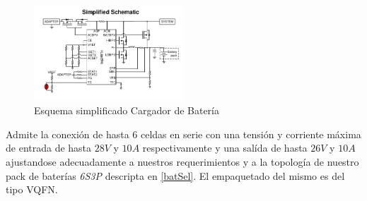 \documentclass[10pt,a4paper]{article}
\begin{document}
\begin{figure}[h!]
    \centering
    \includegraphics[width=0.5\textwidth]{bat_char/simp_sch_char.png}
    \caption{Esquema simplificado Cargador de Batería}
    \label{fig:simp_sch_char}
\end{figure}
\FloatBarrier

Admite la conexión de hasta 6 celdas en serie con una tensión y
corriente máxima de entrada de hasta $28V$ y $10A$ respectivamente y una salída
de hasta $26V$ y $10A$ ajustandose adecuadamente a nuestros requerimientos y a
la topología de nuestro pack de baterías \emph{6S3P} descripta en \ref{batSel}.
El empaquetado del mismo es del tipo VQFN.

%
%
\end{document}
